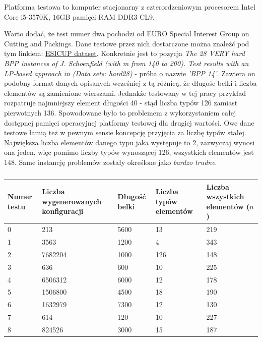 Platforma testowa to komputer stacjonarny z czterordzeniowym procesorem Intel Core i5-3570K, 16GB pamięci RAM DDR3 CL9.

Warto dodać, że test numer dwa pochodzi od EURO Special Interest Group on Cutting and Packings. Dane testowe przez nich dostarczone można znaleźć pod tym linkiem:
\href{https://www.euro-online.org/websites/esicup/data-sets/}{ESICUP dataset}.
Konkretnie jest to pozycja \textit{The 28 VERY hard BPP instances of J. Schoenfield (with m from 140 to 200). Test results with an LP-based approach in (Data sets: hard28)} - próba o nazwie \textit{'BPP    14'}. Zawiera on podobny format danych opisanych wcześniej z tą różnicą, że długośc belki i liczba elementów są zamienione wierszami. Jednakże testowany w tej pracy przykład rozpatruje najmniejszy element długości 40 - stąd liczba typów 126 zamiast pierwotnych 136. Spowodowane było to problemem z wykorzystaniem całej dostępnej pamięci operacyjnej platformy testowej dla drugiej wartości. Owe dane testowe łamią też w pewnym sensie koncepcję przyjęcia za liczbę typów stałej. Największa liczba elementów danego typu jaka występuje to 2, zazwyczaj wynosi ona jeden, więc pomimo liczby typów wynoszącej 126, wszystkich elementów jest 148. Same instancję problemów zostały określone jako \textit{bardzo trudne}.


\begin{table}[H] 
	\begin{center}
		\begin{tabular}{|p{1cm}|p{3cm}|p{3cm}|p{3cm}|p{3cm}| } \hline
			Numer testu & Liczba wygenerowanych konfiguracji & Długość belki & Liczba typów elementów & Liczba wszystkich elementów ($n$)\\ \hline
			0 & 213 & 5600 & 13 & 219\\ 
			1 & 3563 & 1200 & 4 & 343\\ 
			2 & 7682204 & 1000 & 126 & 148\\ 
			3 & 636 & 600 & 10 & 225\\ 
			4 & 6506312 & 6000 & 12 & 178\\ 
			5 & 1506800 & 4500 & 18 & 190\\ 
			6 & 1632979 & 7300 & 12 & 130\\ 
			7 & 614 & 120 & 10 & 227\\ 
			8 & 824526 & 3000 & 15 & 187\\ 
			\hline
		\end{tabular}
		\caption{}
	\end{center}
\end{table}

